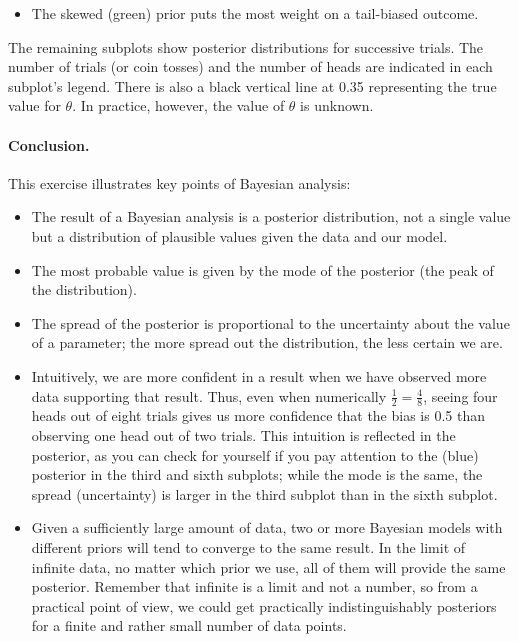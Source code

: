 \begin{example}
\begin{itemize}
        \item The skewed (green) prior puts the most weight on a tail-biased outcome.
    \end{itemize}

    The remaining subplots show posterior distributions for successive trials. The number of trials (or coin tosses) and the number of heads are indicated in each subplot's legend. There is also a black vertical line at 0.35 representing the true value for $\theta$. In practice, however, the value of $\theta$ is unknown.

    \paragraph{Conclusion.} This exercise illustrates key points of Bayesian analysis:
    \begin{itemize}
        \item The result of a Bayesian analysis is a posterior distribution, not a single value but a distribution of plausible values given the data and our model.
        
        \item The most probable value is given by the mode of the posterior (the peak of the distribution).
        
        \item The spread of the posterior is proportional to the uncertainty about the value of a parameter; the more spread out the distribution, the less certain we are.
        
        \item Intuitively, we are more confident in a result when we have observed more data supporting that result. Thus, even when numerically $\tfrac{1}{2}=\tfrac{4}{8}$, seeing four heads out of eight trials gives us more confidence that the bias is 0.5 than observing one head out of two trials. This intuition is reflected in the posterior, as you can check for yourself if you pay attention to the (blue) posterior in the third and sixth subplots; while the mode is the same, the spread (uncertainty) is larger in the third subplot than in the sixth subplot.
        
        \item Given a sufficiently large amount of data, two or more Bayesian models with different priors will tend to converge to the same result. In the limit of infinite data, no matter which prior we use, all of them will provide the same posterior. Remember that infinite is a limit and not a number, so from a practical point of view, we could get practically indistinguishably posteriors for a finite and rather small number of data points.
        

\end{itemize}
\end{example}
